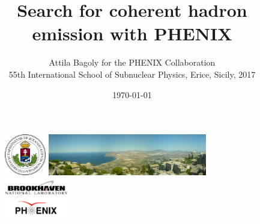 \documentclass{beamer}
\title[HBT]{\Large{Search for coherent hadron emission with PHENIX}}
\author[Attila Bagoly]{\large{Attila Bagoly for the PHENIX Collaboration
}\\ \vspace{1cm}
\small{55th International School of Subnuclear Physics, Erice, Sicily, 2017}
}
\date[\today]{\today}
\institute[ELTE]{
}
\begin{document}
\begin{frame}
  \titlepage
  \begin{figure}
  \hspace*{-8pt} \includegraphics[height=18mm]{pic/ELTE.png}\;\;
   \includegraphics[height=18mm]{pic/erice.pdf}\;\;
   \includegraphics[height=18mm]{pic/BNLPHENIX.pdf}
  \end{figure}
\end{frame}

\end{document}
